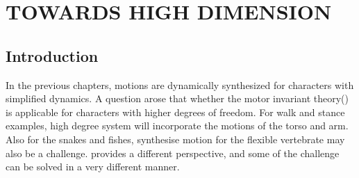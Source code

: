 \chapter{TOWARDS HIGH DIMENSION}
\label{chap:highdor}
\graphicspath{{HiDof/HiDofFigs/EPS/}{HiDof/HiDofFigs/}}
\section{Introduction}
In the previous chapters, motions are dynamically synthesized for characters with simplified dynamics.
A question arose that whether the  motor invariant theory(\moit) is applicable for characters with higher degrees of freedom.
For walk and stance examples, high degree system will incorporate the motions of the torso and arm.
Also for the snakes and fishes, synthesise motion for the flexible vertebrate may also be a challenge.
\moit provides a different perspective, and some of the challenge can be solved in a very different manner.



